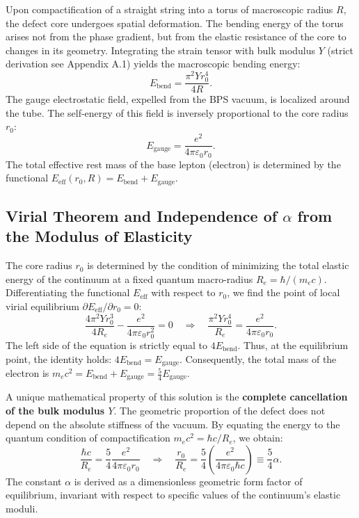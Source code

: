 \documentclass[11pt,a4paper]{article}
\begin{document}
	Upon compactification of a straight string into a torus of macroscopic radius $R$, the defect core undergoes spatial deformation. The bending energy of the torus arises not from the phase gradient, but from the elastic resistance of the core to changes in its geometry. Integrating the strain tensor with bulk modulus $Y$ (strict derivation see Appendix A.1) yields the macroscopic bending energy:
	\begin{equation}
		E_{\text{bend}} = \frac{\pi^2 Y r_0^4}{4 R}.
	\end{equation}
	The gauge electrostatic field, expelled from the BPS vacuum, is localized around the tube. The self-energy of this field is inversely proportional to the core radius $r_0$:
	\begin{equation}
		E_{\text{gauge}} = \frac{e^2}{4\pi\varepsilon_0 r_0}.
	\end{equation}
	The total effective rest mass of the base lepton (electron) is determined by the functional $E_{\text{eff}}(r_0, R) = E_{\text{bend}} + E_{\text{gauge}}$.
	
\subsection{Virial Theorem and Independence of $\alpha$ from the Modulus of Elasticity}
	The core radius $r_0$ is determined by the condition of minimizing the total elastic energy of the continuum at a fixed quantum macro-radius $R_e = \hbar / (m_e c)$.
	Differentiating the functional $E_{\text{eff}}$ with respect to $r_0$, we find the point of local virial equilibrium $\partial E_{\text{eff}} / \partial r_0 = 0$:
	\begin{equation}
		\frac{4 \pi^2 Y r_0^3}{4R_e} - \frac{e^2}{4\pi\varepsilon_0 r_0^2} = 0 \quad \Longrightarrow \quad \frac{\pi^2 Y r_0^4}{R_e} = \frac{e^2}{4\pi\varepsilon_0 r_0}.
	\end{equation}
	The left side of the equation is strictly equal to $4 E_{\text{bend}}$. Thus, at the equilibrium point, the identity holds: $4 E_{\text{bend}} = E_{\text{gauge}}$.
	Consequently, the total mass of the electron is $m_e c^2 = E_{\text{bend}} + E_{\text{gauge}} = \frac{5}{4} E_{\text{gauge}}$. 
	
	A unique mathematical property of this solution is the \textbf{complete cancellation of the bulk modulus $Y$}. The geometric proportion of the defect does not depend on the absolute stiffness of the vacuum. By equating the energy to the quantum condition of compactification $m_e c^2 = \hbar c / R_e$, we obtain:
	\begin{equation}
		\frac{\hbar c}{R_e} = \frac{5}{4} \frac{e^2}{4\pi\varepsilon_0 r_0} \quad \Longrightarrow \quad \frac{r_0}{R_e} = \frac{5}{4} \left( \frac{e^2}{4\pi\varepsilon_0 \hbar c} \right) \equiv \frac{5}{4} \alpha.
	\label{alpha_derivation}
	\end{equation}
	The constant $\alpha$ is derived as a dimensionless geometric form factor of equilibrium, invariant with respect to specific values of the continuum's elastic moduli.
	
\end{document}
